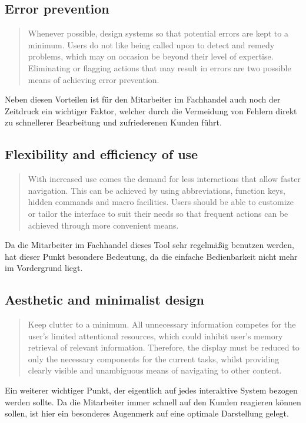 \subsection{Error prevention}
\begin{quote} Whenever possible, design systems so that potential errors are kept to a minimum. Users do not like being called upon to detect and remedy problems, which may on occasion be beyond their level of expertise. Eliminating or flagging actions that may result in errors are two possible means of achieving error prevention.\end{quote}

Neben diesen Vorteilen ist für den Mitarbeiter im Fachhandel auch noch der Zeitdruck ein wichtiger Faktor, welcher durch die Vermeidung von Fehlern direkt zu schnellerer Bearbeitung und zufriederenen Kunden führt. 

\subsection{Flexibility and efficiency of use}
\begin{quote} With increased use comes the demand for less interactions that allow faster navigation. This can be achieved by using abbreviations, function keys, hidden commands and macro facilities. Users should be able to customize or tailor the interface to suit their needs so that frequent actions can be achieved through more convenient means.\end{quote}

Da die Mitarbeiter im Fachhandel dieses Tool sehr regelmäßig benutzen werden, hat dieser Punkt besondere Bedeutung, da die einfache Bedienbarkeit nicht mehr im Vordergrund liegt.

\subsection{Aesthetic and minimalist design}
\begin{quote} Keep clutter to a minimum. All unnecessary information competes for the user's limited attentional resources, which could inhibit user’s memory retrieval of relevant information. Therefore, the display must be reduced to only the necessary components for the current tasks, whilst providing clearly visible and unambiguous means of navigating to other content.\end{quote}

Ein weiterer wichtiger Punkt, der eigentlich auf jedes interaktive System bezogen werden sollte. Da die Mitarbeiter immer schnell auf den Kunden reagieren können sollen, ist hier ein besonderes Augenmerk auf eine optimale Darstellung gelegt.